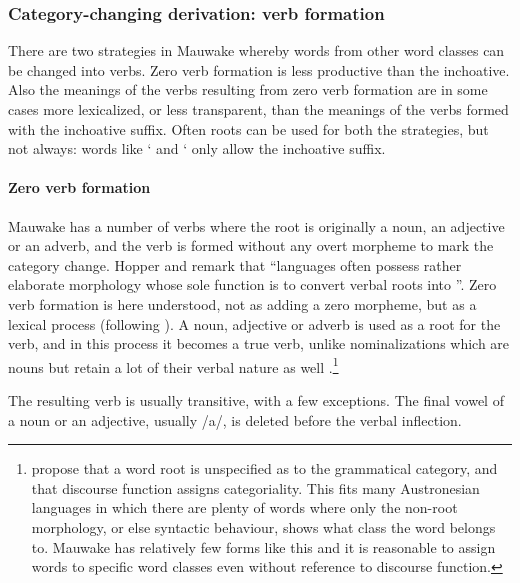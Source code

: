 \subsubsection{Category-changing derivation: verb formation}\label{sec:3:z:y:x}
{}
There are two strategies in Mauwake whereby words from other word classes can be changed into verbs. Zero verb formation is less productive than the inchoative. Also the meanings of the verbs resulting from zero verb formation are in some cases more lexicalized, or less transparent, than the meanings of the verbs formed with the inchoative suffix. Often roots can be used for both the strategies, but not always: words like  ` and  ` only allow the inchoative suffix.

\paragraph{Zero verb formation}\label{sec:3:a:z:y:x}
{}
Mauwake has a number of verbs where the root is originally a noun, an adjective or an adverb, and the verb is formed without any overt morpheme to mark the category change. Hopper and \citet[745]{Thompson1984} remark that ``{languages often possess rather elaborate morphology whose sole function is to convert verbal roots into}  ''. Zero verb formation is here understood, not as adding a zero morpheme, but as a lexical process (following \citealt[224]{Payne1997}). A noun, adjective or adverb is used as a root for the verb, and in this process it becomes a true verb, unlike nominalizations which are nouns but retain a lot of their verbal nature as well \citep[747]{HopperEtAl1984}%
.\footnote{\citet{HopperEtAl1984} propose that a word root is unspecified as to the grammatical category, and that discourse function assigns categoriality. This fits many Austronesian languages in which there are plenty of words where only the non-root morphology, or else syntactic behaviour, shows what class the word belongs to. Mauwake has relatively few forms like this and it is reasonable to assign words to specific word classes even without reference to discourse function.}

The resulting verb is usually transitive, with a few exceptions. The final vowel of a noun or an adjective, usually /a/, is deleted before the verbal inflection. 


